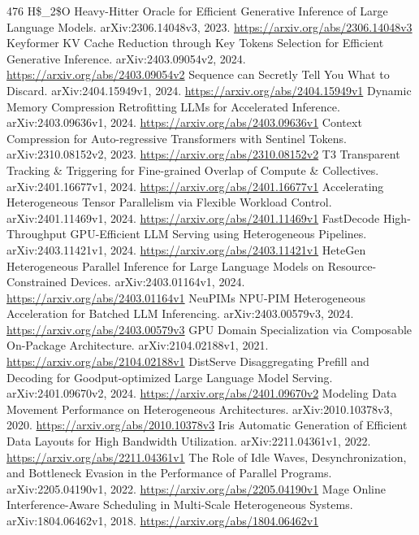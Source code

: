 \documentclass[11pt]{article}
\begin{document}
\begin{thebibliography}{476}
 H\$\_2\$O Heavy-Hitter Oracle for Efficient Generative Inference of Large Language Models. arXiv:2306.14048v3, 2023. \url{https://arxiv.org/abs/2306.14048v3}
 Keyformer KV Cache Reduction through Key Tokens Selection for Efficient Generative Inference. arXiv:2403.09054v2, 2024. \url{https://arxiv.org/abs/2403.09054v2}
 Sequence can Secretly Tell You What to Discard. arXiv:2404.15949v1, 2024. \url{https://arxiv.org/abs/2404.15949v1}
 Dynamic Memory Compression Retrofitting LLMs for Accelerated Inference. arXiv:2403.09636v1, 2024. \url{https://arxiv.org/abs/2403.09636v1}
 Context Compression for Auto-regressive Transformers with Sentinel Tokens. arXiv:2310.08152v2, 2023. \url{https://arxiv.org/abs/2310.08152v2}
 T3 Transparent Tracking \& Triggering for Fine-grained Overlap of Compute \& Collectives. arXiv:2401.16677v1, 2024. \url{https://arxiv.org/abs/2401.16677v1}
 Accelerating Heterogeneous Tensor Parallelism via Flexible Workload Control. arXiv:2401.11469v1, 2024. \url{https://arxiv.org/abs/2401.11469v1}
 FastDecode High-Throughput GPU-Efficient LLM Serving using Heterogeneous Pipelines. arXiv:2403.11421v1, 2024. \url{https://arxiv.org/abs/2403.11421v1}
 HeteGen Heterogeneous Parallel Inference for Large Language Models on Resource-Constrained Devices. arXiv:2403.01164v1, 2024. \url{https://arxiv.org/abs/2403.01164v1}
 NeuPIMs NPU-PIM Heterogeneous Acceleration for Batched LLM Inferencing. arXiv:2403.00579v3, 2024. \url{https://arxiv.org/abs/2403.00579v3}
 GPU Domain Specialization via Composable On-Package Architecture. arXiv:2104.02188v1, 2021. \url{https://arxiv.org/abs/2104.02188v1}
 DistServe Disaggregating Prefill and Decoding for Goodput-optimized Large Language Model Serving. arXiv:2401.09670v2, 2024. \url{https://arxiv.org/abs/2401.09670v2}
 Modeling Data Movement Performance on Heterogeneous Architectures. arXiv:2010.10378v3, 2020. \url{https://arxiv.org/abs/2010.10378v3}
 Iris Automatic Generation of Efficient Data Layouts for High Bandwidth Utilization. arXiv:2211.04361v1, 2022. \url{https://arxiv.org/abs/2211.04361v1}
 The Role of Idle Waves, Desynchronization, and Bottleneck Evasion in the Performance of Parallel Programs. arXiv:2205.04190v1, 2022. \url{https://arxiv.org/abs/2205.04190v1}
 Mage Online Interference-Aware Scheduling in Multi-Scale Heterogeneous Systems. arXiv:1804.06462v1, 2018. \url{https://arxiv.org/abs/1804.06462v1}

\end{thebibliography}
\end{document}
